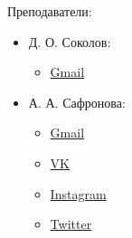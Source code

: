 \documentclass[12pt,a4paper]{article}
\begin{document}
    Преподаватели:
    \begin{itemize}
        \item Д. О. Соколов:
            \begin{itemize}
                \item \href{mailto:sokolov.dmt@gmail.com}{Gmail}
            \end{itemize}
        \item А. А. Сафронова:
            \begin{itemize}
                \item \href{mailto:ana.a.sofronova@}{Gmail}
                \item \href{https://vk.com/hamelinny}{VK}
                \item \href{https://www.instagram.com/hamelinny/}{Instagram}
                \item \href{https://twitter.com/hamelinny}{Twitter}
            \end{itemize}
    \end{itemize}
\end{document}
